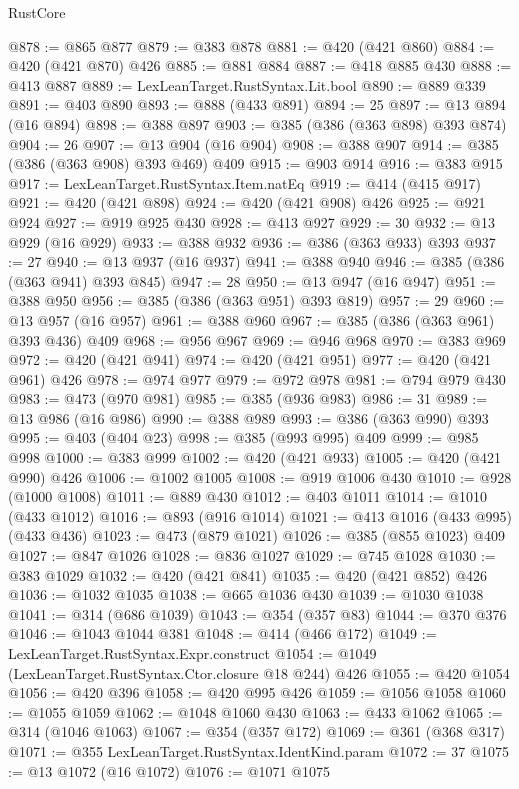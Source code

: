\begin{lexlean}{RustCore}
\begin{coremodule}
@878 := @865 @877
@879 := @383 @878
@881 := @420 (@421 @860)
@884 := @420 (@421 @870) @426
@885 := @881 @884
@887 := @418 @885 @430
@888 := @413 @887
@889 := LexLeanTarget.RustSyntax.Lit.bool
@890 := @889 @339
@891 := @403 @890
@893 := @888 (@433 @891)
@894 := 25
@897 := @13 @894 (@16 @894)
@898 := @388 @897
@903 := @385 (@386 (@363 @898) @393 @874)
@904 := 26
@907 := @13 @904 (@16 @904)
@908 := @388 @907
@914 := @385 (@386 (@363 @908) @393 @469) @409
@915 := @903 @914
@916 := @383 @915
@917 := LexLeanTarget.RustSyntax.Item.natEq
@919 := @414 (@415 @917)
@921 := @420 (@421 @898)
@924 := @420 (@421 @908) @426
@925 := @921 @924
@927 := @919 @925 @430
@928 := @413 @927
@929 := 30
@932 := @13 @929 (@16 @929)
@933 := @388 @932
@936 := @386 (@363 @933) @393
@937 := 27
@940 := @13 @937 (@16 @937)
@941 := @388 @940
@946 := @385 (@386 (@363 @941) @393 @845)
@947 := 28
@950 := @13 @947 (@16 @947)
@951 := @388 @950
@956 := @385 (@386 (@363 @951) @393 @819)
@957 := 29
@960 := @13 @957 (@16 @957)
@961 := @388 @960
@967 := @385 (@386 (@363 @961) @393 @436) @409
@968 := @956 @967
@969 := @946 @968
@970 := @383 @969
@972 := @420 (@421 @941)
@974 := @420 (@421 @951)
@977 := @420 (@421 @961) @426
@978 := @974 @977
@979 := @972 @978
@981 := @794 @979 @430
@983 := @473 (@970 @981)
@985 := @385 (@936 @983)
@986 := 31
@989 := @13 @986 (@16 @986)
@990 := @388 @989
@993 := @386 (@363 @990) @393
@995 := @403 (@404 @23)
@998 := @385 (@993 @995) @409
@999 := @985 @998
@1000 := @383 @999
@1002 := @420 (@421 @933)
@1005 := @420 (@421 @990) @426
@1006 := @1002 @1005
@1008 := @919 @1006 @430
@1010 := @928 (@1000 @1008)
@1011 := @889 @430
@1012 := @403 @1011
@1014 := @1010 (@433 @1012)
@1016 := @893 (@916 @1014)
@1021 := @413 @1016 (@433 @995) (@433 @436)
@1023 := @473 (@879 @1021)
@1026 := @385 (@855 @1023) @409
@1027 := @847 @1026
@1028 := @836 @1027
@1029 := @745 @1028
@1030 := @383 @1029
@1032 := @420 (@421 @841)
@1035 := @420 (@421 @852) @426
@1036 := @1032 @1035
@1038 := @665 @1036 @430
@1039 := @1030 @1038
@1041 := @314 (@686 @1039)
@1043 := @354 (@357 @83)
@1044 := @370 @376
@1046 := @1043 @1044 @381
@1048 := @414 (@466 @172)
@1049 := LexLeanTarget.RustSyntax.Expr.construct
@1054 := @1049 (LexLeanTarget.RustSyntax.Ctor.closure @18 @244) @426
@1055 := @420 @1054
@1056 := @420 @396
@1058 := @420 @995 @426
@1059 := @1056 @1058
@1060 := @1055 @1059
@1062 := @1048 @1060 @430
@1063 := @433 @1062
@1065 := @314 (@1046 @1063)
@1067 := @354 (@357 @172)
@1069 := @361 (@368 @317)
@1071 := @355 LexLeanTarget.RustSyntax.IdentKind.param
@1072 := 37
@1075 := @13 @1072 (@16 @1072)
@1076 := @1071 @1075

\end{coremodule}
\end{lexlean}
